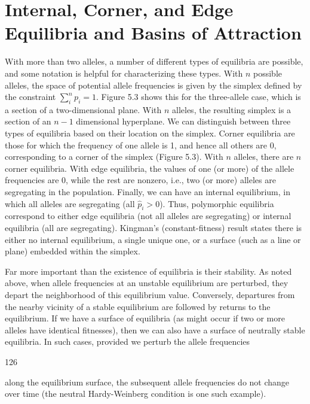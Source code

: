 \documentclass{article}
\begin{document}
\section{Internal, Corner, and Edge Equilibria and Basins of Attraction}
With more than two alleles, a number of different types of equilibria are possible, and some notation is helpful for characterizing these types. With $n$ possible alleles, the space of potential allele frequencies is given by the simplex defined by the constraint $\sum_i^n p_i = 1$. Figure 5.3 shows this for the three-allele case, which is a section of a two-dimensional plane. With $n$ alleles, the resulting simplex is a section of an $n-1$ dimensional hyperplane. We can distinguish between three types of equilibria based on their location on the simplex. Corner equilibria are those for which the frequency of one allele is 1, and hence all others are 0, corresponding to a corner of the simplex (Figure 5.3). With $n$ alleles, there are $n$ corner equilibria. With edge equilibria, the values of one (or more) of the allele frequencies are 0, while the rest are nonzero, i.e., two (or more) alleles are segregating in the population. Finally, we can have an internal equilibrium, in which all alleles are segregating (all $\widehat{p}_i > 0$). Thus, polymorphic equilibria correspond to either edge equilibria (not all alleles are segregating) or internal equilibria (all are segregating). Kingman's (constant-fitness) result states there is either no internal equilibrium, a single unique one, or a surface (such as a line or plane) embedded within the simplex.

Far more important than the existence of equilibria is their stability. As noted above, when allele frequencies at an unstable equilibrium are perturbed, they depart the neighborhood of this equilibrium value. Conversely, departures from the nearby vicinity of a stable equilibrium are followed by returns to the equilibrium. If we have a surface of equilibria (as might occur if two or more alleles have identical fitnesses), then we can also have a surface of neutrally stable equilibria. In such cases, provided we perturb the allele frequencies

126

along the equilibrium surface, the subsequent allele frequencies do not change over time (the neutral Hardy-Weinberg condition is one such example).
\end{document}
